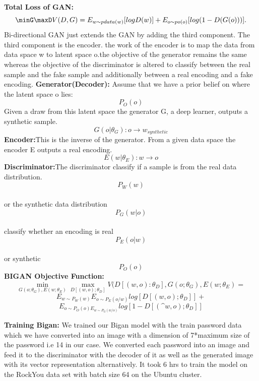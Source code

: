 \documentclass[runningheads]{llncs}
\begin{document}
\newline
\textbf{Total Loss of GAN:}
\[ \minG  \maxD  V (D, G)=E _{w \sim pdata(w)}[log D(w)] + E _{o \sim p o(o)} [log(1-D(G(o)))]. \]\newline
Bi-directional GAN just extends the GAN by adding the third component. The third component is the encoder. the work of the encoder is to map the data from data space w to latent space o.the objective of the generator remains the same whereas the objective of the discriminator is altered to classify between the real sample and the fake sample and additionally between a real encoding and a fake encoding.
\newline
\textbf{Generator(Decoder):}
\newline
Assume that we have a prior belief on where the latent space o lies:\[{P_O(o)}\] Given a draw from this latent space the generator G, a deep learner, outputs a synthetic sample.
\[ G(o|\theta_G):o\rightarrow w_{synthetic}\]
\newline
\textbf{Encoder:}This is the inverse of the generator. From a given data space the encoder E outputs a real encoding.\[ E(w|\theta_E):w \rightarrow o\]
\textbf{Discriminator:}The discriminator classify if a sample is from the real data distribution.
\[{P_W(w)}\] \\ or the synthetic data distribution \[P_G(w|o)\]\\ classify whether an encoding is real \[ P_E(o|w)\] \\ or synthetic \[P_O(o) \]
\textbf{BIGAN Objective Function:}
\newline
\begin{equation*}
\min_{G(o;\theta_G),E(w;\theta_E)}  \max_{D[(w,o);\theta_D]}V(D[(w,o):\theta_D],G(o;\theta_G),E(w;\theta_E)=
\end{equation*}
\begin{equation*}
E_{w\sim P_{W}(w)}E_{o\sim P_{E}(o/w)}log[D[(w,o); \theta_D ]]+
\end{equation*}
\begin{equation*}
E_{o\sim P_{O}(o)E_{w\sim P_{G}(w/o)}}log[1-D[(\^{w},o); \theta_D ]]
\end{equation*}

\newline
\textbf{Training Bigan:}
\newline
We trained our Bigan model with the train password data which we have converted into an image with a dimension of 7*maximum size of the password i.e 14 in our case. We converted each password into an image and feed it to the discriminator with the decoder of it as well as the generated image with its vector representation alternatively.
It took 6 hrs to train the model on the RockYou data set with batch size 64 on the Ubuntu cluster. 
\end{document}
